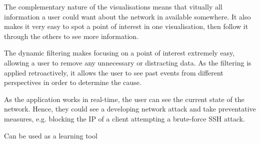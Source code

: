 The complementary nature of the visualisations means that vitually all information a user could want about the network in available somewhere.  It also makes it very easy to spot a point of interest in one visualisation, then follow it through the others to see more information.

The dynamic filtering makes focusing on a point of interest extremely easy, allowing a user to remove any unnecessary or distracting data.  As the filtering is applied retroactively, it allows the user to see past events from different perspectives in order to determine the cause.

As the application works in real-time, the user can see the current state of the network.  Hence, they could see a developing network attack and take preventative measures, e.g. blocking the IP of a client attempting a brute-force SSH attack.

Can be used as a learning tool